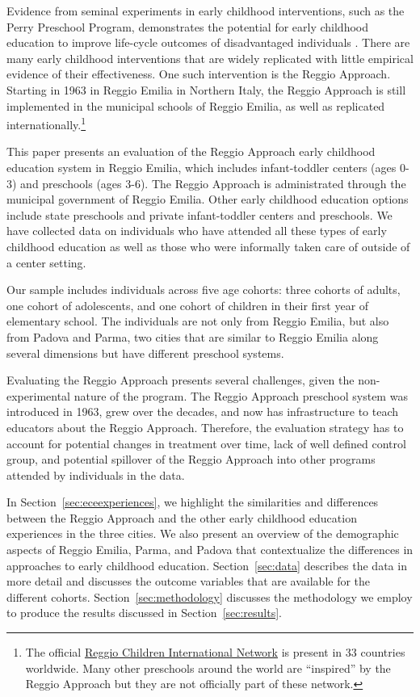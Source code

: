 Evidence from seminal experiments in early childhood interventions, such as the Perry Preschool Program, demonstrates the potential for early childhood education to improve life-cycle outcomes of disadvantaged individuals \citep{Heckman_Moon_etal_2010_QE, Elango_Hojman_etal_2016_Early-Edu}. There are many early childhood interventions that are widely replicated with little empirical evidence of their effectiveness. One such intervention is the Reggio Approach. Starting in 1963 in Reggio Emilia in Northern Italy, the Reggio Approach is still implemented in the municipal schools of Reggio Emilia, as well as replicated internationally.\footnote{The official \href{http://www.reggiochildren.it/network/?lang=en}{Reggio Children International Network} is present in 33 countries worldwide. Many other preschools around the world are ``inspired'' by the Reggio Approach but they are not officially part of these network.}

This paper presents an evaluation of the Reggio Approach early childhood education system in Reggio Emilia, which includes infant-toddler centers (ages 0-3) and preschools (ages 3-6). The Reggio Approach is administrated through the municipal government of Reggio Emilia. Other early childhood education options include state preschools and private infant-toddler centers and preschools. We have collected data on individuals who have attended all these types of early childhood education as well as those who were informally taken care of outside of a center setting. 

Our sample includes individuals across five age cohorts: three cohorts of adults, one cohort of adolescents, and one cohort of children in their first year of elementary school. The individuals are not only from Reggio Emilia, but also from Padova and Parma, two cities that are similar to Reggio Emilia along several dimensions but have different preschool systems. 

Evaluating the Reggio Approach presents several challenges, given the non-experimental nature of the program. The Reggio Approach preschool system was introduced in 1963, grew over the decades, and now has infrastructure to teach educators about the Reggio Approach. Therefore, the evaluation strategy has to account for potential changes in treatment over time, lack of well defined control group, and potential spillover of the Reggio Approach into other programs attended by individuals in the data. 


In Section~\ref{sec:eceexperiences}, we highlight the similarities and differences between the Reggio Approach and the other early childhood education experiences in the three cities. We also present an overview of the demographic aspects of Reggio Emilia, Parma, and Padova that contextualize the differences in approaches to early childhood education. Section~\ref{sec:data} describes the data in more detail and discusses the outcome variables that are available for the different cohorts. Section~\ref{sec:methodology} discusses the methodology we employ to produce the results discussed in Section~\ref{sec:results}. 
